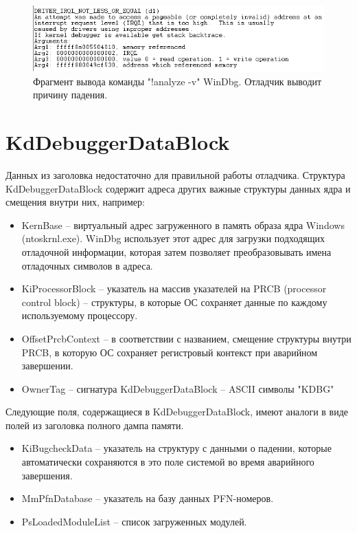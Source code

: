 \documentclass{mipt-thesis-bs}
\begin{document}
\begin{figure}[h]
\begin{center}
    \captionsetup{justification=centering}
    \includegraphics{ss1.png}
    \caption{Фрагмент вывода команды "!analyze -v" WinDbg. Отладчик выводит причину падения.}
    \label{fig:windbg-analyze}
\end{center}
\end{figure}

\section*{KdDebuggerDataBlock}

Данных из заголовка недостаточно для правильной работы отладчика. Структура KdDebuggerDataBlock содержит адреса других важные структуры данных ядра и смещения внутри них, например:
\begin{itemize}
\item KernBase -- виртуальный адрес загруженного в память образа ядра Windows (ntoskrnl.exe). WinDbg использует этот адрес для загрузки подходящих отладочной информации, которая затем позволяет преобразовывать имена отладочных символов в адреса.
\item KiProcessorBlock -- указатель на массив указателей на PRCB (processor control block) -- структуры, в которые ОС сохраняет данные по каждому используемому процессору\cite{winternals1}.
\item OffsetPrcbContext -- в соответствии с названием, смещение структуры внутри PRCB, в которую ОС сохраняет регистровый контекст при аварийном завершении.
\item OwnerTag -- сигнатура KdDebuggerDataBlock -- ASCII символы "KDBG"
\end{itemize}
Следующие поля, содержащиеся в KdDebuggerDataBloсk, имеют аналоги в виде полей из заголовка полного дампа памяти.
\begin{itemize}
\item KiBugcheckData -- указатель на структуру с данными о падении, которые автоматически сохраняются в это поле системой во время аварийного завершения.
\item MmPfnDatabase -- указатель на базу данных PFN-номеров.
\item PsLoadedModuleList -- список загруженных модулей.
\end{itemize}
\end{document}
